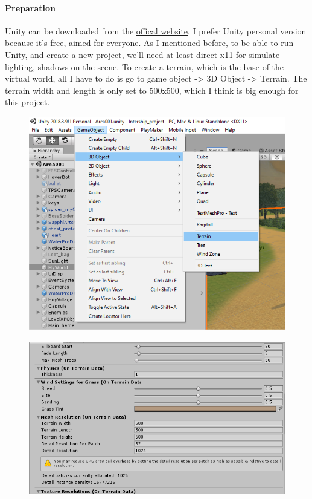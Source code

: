 \documentclass[a4paper, 13pt]{extarticle}
\begin{document}
 		  \paragraph{Preparation}
 		  Unity can be downloaded from the \href{https://store.Unity.com/}{offical website}. I prefer Unity personal version because it's free, aimed for everyone. As I mentioned before, to be able to run Unity, and create a new project, we'll need at least direct x11 for simulate lighting, shadows on the scene. To create a terrain, which is the base of the virtual world, all I have to do is go to game object -> 3D Object -> Terrain. The terrain width and length is only set to 500x500, which I think is big enough for this project.  \begin{figure}[h]
 		  	\centering
 		  	\begin{minipage}{.4\textwidth}
 		  		\centering
 		  		\includegraphics[width=1\linewidth]{intructions/1.png}
 		  		\label{fig:test2}
 		  	\end{minipage}
 		  	\begin{minipage}{.4\textwidth}
 		  		\centering
 		  		\includegraphics[width=1.4\linewidth]{intructions/2.png}
 		  		\label{fig:test3}
 		  	\end{minipage}
 		  \end{figure}
\end{document}
